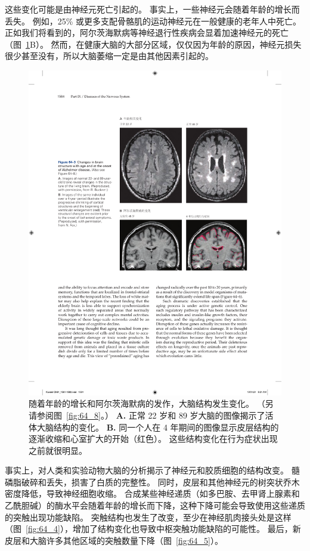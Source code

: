 这些变化可能是由神经元死亡引起的。
事实上，一些神经元会随着年龄的增长而丢失。
例如，25\% 或更多支配骨骼肌的运动神经元在一般健康的老年人中死亡。
正如我们将看到的，阿尔茨海默病等神经退行性疾病会显着加速神经元的死亡（图~\ref{fig:64_3}B）。
然而，在健康大脑的大部分区域，仅仅因为年龄的原因，神经元损失很少甚至没有，所以大脑萎缩一定是由其他因素引起的。


\begin{figure}[htbp]
	\centering
	\includegraphics[width=0.9\linewidth]{chap64/fig_64_3}
	\caption{随着年龄的增长和阿尔茨海默病的发作，大脑结构发生变化。
		（另请参阅图~\ref{fig:64_8}。）
		\textbf{A.} 正常 22 岁和 89 岁大脑的图像揭示了活体大脑结构的变化。
		\textbf{B.} 同一个人在 4 年期间的图像显示皮层结构的逐渐收缩和心室扩大的开始（红色）。
		这些结构变化在行为症状出现之前就很明显。}
	\label{fig:64_3}
\end{figure}


事实上，对人类和实验动物大脑的分析揭示了神经元和胶质细胞的结构改变。
髓磷脂破碎和丢失，损害了白质的完整性。
同时，皮层和其他神经元的树突状乔木密度降低，导致神经细胞收缩。
合成某些神经递质（如多巴胺、去甲肾上腺素和乙酰胆碱）的酶水平会随着年龄的增长而下降，这种下降可能会导致使用这些递质的突触出现功能缺陷。
突触结构也发生了改变，至少在神经肌肉接头处是这样（图~\ref{fig:64_4}），增加了结构变化也导致中枢突触功能缺陷的可能性。
最后，新皮层和大脑许多其他区域的突触数量下降（图~\ref{fig:64_5}）。


